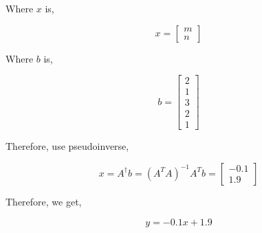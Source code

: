\documentclass{article}
\begin{document}
Where $x$ is,

$$x = \begin{bmatrix} m \\ n \end{bmatrix}$$


Where $b$ is,

$$b =\begin{bmatrix} 2 \\ 1 \\3\\2\\1 \end{bmatrix}$$

Therefore, use pseudoinverse,

$$x = A^{\dagger}b = (A^TA)^{-1}A^Tb = \begin{bmatrix} -0.1 \\ 1.9 \end{bmatrix}$$

Therefore, we get,

$$y = -0.1x + 1.9$$
\end{document}
